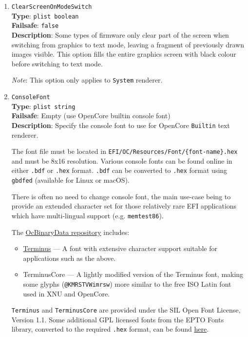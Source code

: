 \documentclass[]{article}
\providecommand{\tightlist}{%
  \setlength{\itemsep}{0pt}\setlength{\parskip}{0pt}}
\begin{document}
\begin{enumerate}

\item
  \texttt{ClearScreenOnModeSwitch}\\
  \textbf{Type}: \texttt{plist\ boolean}\\
  \textbf{Failsafe}: \texttt{false}\\
  \textbf{Description}: Some types of firmware only clear part of the screen when switching
  from graphics to text mode, leaving a fragment of previously drawn images visible.
  This option fills the entire graphics screen with black colour before switching to
  text mode.

  \emph{Note}: This option only applies to \texttt{System} renderer.

\item
  \texttt{ConsoleFont}\\
  \textbf{Type}: \texttt{plist\ string}\\
  \textbf{Failsafe}: Empty (use OpenCore builtin console font)\\
  \textbf{Description}: Specify the console font to use for OpenCore \texttt{Builtin} text renderer.

  The font file must be located in \texttt{EFI/OC/Resources/Font/\{font-name\}.hex} and must
  be 8x16 resolution. Various console fonts can be found online in either \texttt{.bdf} or
  \texttt{.hex} format. \texttt{.bdf} can be converted to \texttt{.hex} format using \texttt{gbdfed}
  (available for Linux or macOS).

  There is often no need to change console font, the main use-case being to
  provide an extended character set for those relatively rare EFI applications which
  have multi-lingual support (e.g. \texttt{memtest86}).

  The \href{https://github.com/acidanthera/OcBinaryData}{OcBinaryData repository} includes:
  \begin{itemize}
    \tightlist
    \item \href{https://terminus-font.sourceforge.net/}{Terminus} --- A font with extensive character
    support suitable for applications such as the above.
    \item TerminusCore --- A lightly modified version of the Terminus font, making some glyphs
    (\texttt{@KMRSTVWimrsw}) more similar to the free ISO Latin font used in XNU and OpenCore.
  \end{itemize}

  \texttt{Terminus} and \texttt{TerminusCore} are provided under the SIL Open Font License, Version 1.1.
  Some additional GPL licensed fonts from the EPTO Fonts library, converted
  to the required \texttt{.hex} format, can be found \href{https://github.com/mikebeaton/epto-fonts}{here}.


\end{enumerate}
\end{document}
